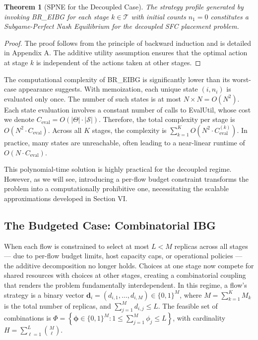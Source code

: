 \documentclass[journal]{IEEEtran}
\theoremstyle{plain}
\newtheorem{theorem}{Theorem}
\theoremstyle{definition}
\theoremstyle{remark}
\begin{document}
\begin{theorem}[SPNE for the Decoupled Case]
\label{thm:br_eibg_spne}
The strategy profile generated by invoking \textsf{BR\_EIBG} for each stage $k \in \mathcal{T}$ with initial counts $n_1=0$ constitutes a Subgame-Perfect Nash Equilibrium for the decoupled SFC placement problem.
\end{theorem}
\begin{proof}
The proof follows from the principle of backward induction and is detailed in Appendix A. The additive utility assumption ensures that the optimal action at stage $k$ is independent of the actions taken at other stages.
\end{proof}

The computational complexity of \textsf{BR\_EIBG} is significantly lower than its worst-case appearance suggests. With memoization, each unique state $(i, n_i)$ is evaluated only once. The number of such states is at most $N \times N = O(N^2)$. Each state evaluation involves a constant number of calls to \textsf{EvalUtil}, whose cost we denote $C_{\mathrm{eval}} = O(|\Theta| \cdot |\mathcal{S}|)$. Therefore, the total complexity per stage is $O(N^2 \cdot C_{\mathrm{eval}})$. Across all $K$ stages, the complexity is $\sum_{k=1}^K O(N^2 \cdot C_{\mathrm{eval}}^{(k)})$. In practice, many states are unreachable, often leading to a near-linear runtime of $O(N \cdot C_{\mathrm{eval}})$.

This polynomial-time solution is highly practical for the decoupled regime. However, as we will see, introducing a per-flow budget constraint transforms the problem into a computationally prohibitive one, necessitating the scalable approximations developed in Section VI.


\subsection{The Budgeted Case: Combinatorial IBG}
\label{sec:exact_budgeted}

When each flow is constrained to select at most $L < M$ replicas across all stages — due to per-flow budget limits, host capacity caps, or operational policies — the additive decomposition no longer holds. Choices at one stage now compete for shared resources with choices at other stages, creating a combinatorial coupling that renders the problem fundamentally interdependent. In this regime, a flow’s strategy is a binary vector $\mathbf{d}_i = (d_{i,1}, \dots, d_{i,M}) \in \{0,1\}^M$, where $M = \sum_{k=1}^K M_k$ is the total number of replicas, and $\sum_{j=1}^M d_{i,j} \leq L$. The feasible set of combinations is $\Phi = \left\{ \boldsymbol{\phi} \in \{0,1\}^M : 1 \leq \sum_{j=1}^M \phi_j \leq L \right\}$, with cardinality $H = \sum_{\ell=1}^L \binom{M}{\ell}$.
\end{document}
